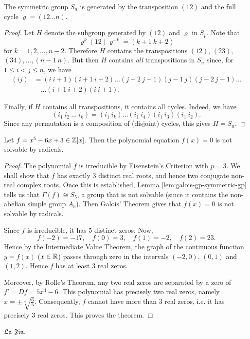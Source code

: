 \begin{fact}
	The symmetric group $S_n$ is generated by the transposition $(12)$ and the full cycle $\varrho = (12 \dots n)$.
	\begin{proof}
		Let $H$ denote the subgroup generated by $(12)$ and $\varrho$ in $S_p$. Note that
		\[
			\varrho^k (12) \varrho^{-k} = (k + 1\ k + 2)
		\]
		for $k = 1, 2, \dots, n - 2$. Therefore $H$ contains the transpositions $(12)$, $(23)$, $(34), \dots, (n - 1\ n)$. But then $H$ contains \emph{all} transpositions in $S_n$ since, for $1 \leq i < j \leq n$, we have
		\begin{align*}
			(ij) &= (i\ i + 1)(i + 1\ i + 2)\dots(j - 2\ j - 1)(j - 1\ j)(j - 2\ j - 1)\dots \\
				& \quad \dots (i + 1\ i + 2)(i\ i + 1).
		\end{align*}
		
		Finally, if $H$ contains all transpositions, it contains all cycles. Indeed, we have
		\[
			(i_1\ i_2\ \dots\ i_k) = (i_1\ i_k)\dots(i_1\ i_4)(i_1\ i_3)(i_1\ i_2).
		\]
		Since any permutation is a composition of (disjoint) cycles, this gives $H = S_n$.
	\end{proof}
\end{fact}

\begin{theorem}
	Let $f = x^5 - 6x + 3 \in \mathbb{Z}[x]$. Then the polynomial equation $f(x) = 0$ is not solvable by radicals.
	\begin{proof}
		The polynomial $f$ is irreducible by Eisenstein's Criterion with $p = 3$. We shall show that $f$ has exactly 3 distinct real roots, and hence two conjugate non-real complex roots. Once this is established, Lemma \ref{lem:galois-gp-symmetric-gp} tells us that $\Gamma(f) \cong S_5$, a group that is not solvable (since it contains the non-abelian simple group $A_5$). Then Galois' Theorem gives that $f(x) = 0 $ is not solvable by radicals.
		
		Since $f$ is irreducible, it has 5 distinct zeros. Now,
		\[
			f(-2) = -17, \quad f(0) = 3, \quad f(1) = -2, \quad f(2) = 23.
		\]
		Hence by the Intermediate Value Theorem, the graph of the continuous function $y = f(x)$ ($x \in \mathbb{R}$) passes through zero in the intervals $(-2, 0)$, $(0, 1)$ and $(1, 2)$. Hence $f$ has at least 3 real zeros.
		
		Moreover, by Rolle's Theorem, any two real zeros are separated by a zero of $f' = Df = 5x^4 - 6$. This polynomial has precisely two real zeros, namely $x = \pm\sqrt[4]{\frac{6}{5}}$. Consequently, $f$ cannot have more than 3 real zeros, i.e. it has precisely 3 real zeros. This proves the theorem.
	\end{proof}
\end{theorem}
\vfill
\pagestyle{empty}
\begin{center}
	$\mathfrak{La}$ $\mathfrak{Fin}$.
\end{center}

